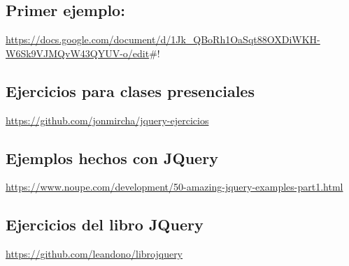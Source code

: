 \documentclass[11pt]{article}
\begin{document}
\subsection*{Primer ejemplo:}
\label{sec:org2d6b4c4}

\url{https://docs.google.com/document/d/1Jk\_QBoRh1OaSqt88OXDiWKH-W6Sk9VJMQvW43QYUV-o/edit}\#!

\subsection*{Ejercicios para clases presenciales}
\label{sec:org3a7ed34}

\url{https://github.com/jonmircha/jquery-ejercicios}

\subsection*{Ejemplos hechos con JQuery}
\label{sec:org0305d2f}

\url{https://www.noupe.com/development/50-amazing-jquery-examples-part1.html}

\subsection*{Ejercicios del libro JQuery}
\label{sec:org6a8660f}

\url{https://github.com/leandono/librojquery}
\end{document}
